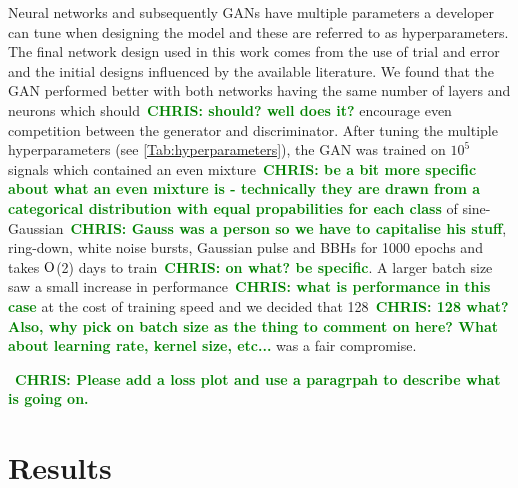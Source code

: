 \documentclass[12pt]{iopart}
\newcommand{\chris}[1]{\textbf{\textcolor{green}{CHRIS: #1}}}
\begin{document}
%
Neural networks and subsequently \acp{GAN} have multiple parameters a developer
can tune when designing the model and these are referred to as hyperparameters.
The final network design used in this work comes from the use of trial and
error and the initial designs influenced by the available literature. We found
that the \ac{GAN} performed better with both networks having the same number of
layers and neurons which should~\chris{should? well does it?} encourage even
competition between the generator and discriminator.  After tuning the multiple
hyperparameters (see \cref{Tab:hyperparameters}), the \ac{GAN} was trained on
$10^5$ signals which contained an even mixture~\chris{be a bit more specific
about what an even mixture is - technically they are drawn from a categorical
distribution with equal propabilities for each class} of
sine-Gaussian~\chris{Gauss was a person so we have to capitalise his stuff},
ring-down, white noise bursts, Gaussian pulse and \acp{BBH} for 1000 epochs and
takes $\mathord{\mathrm{O}}$(2) days to train~\chris{on what? be specific}. A larger batch size
saw a small increase in performance~\chris{what is performance in this case} at
the cost of training speed and we decided that 128~\chris{128 what? Also, why
pick on batch size as the thing to comment on here? What about learning rate,
kernel size, etc...} was a fair compromise. 

~\chris{Please add a loss plot and use a paragrpah to describe what is going
on.}

\section{Results}

\end{document}
